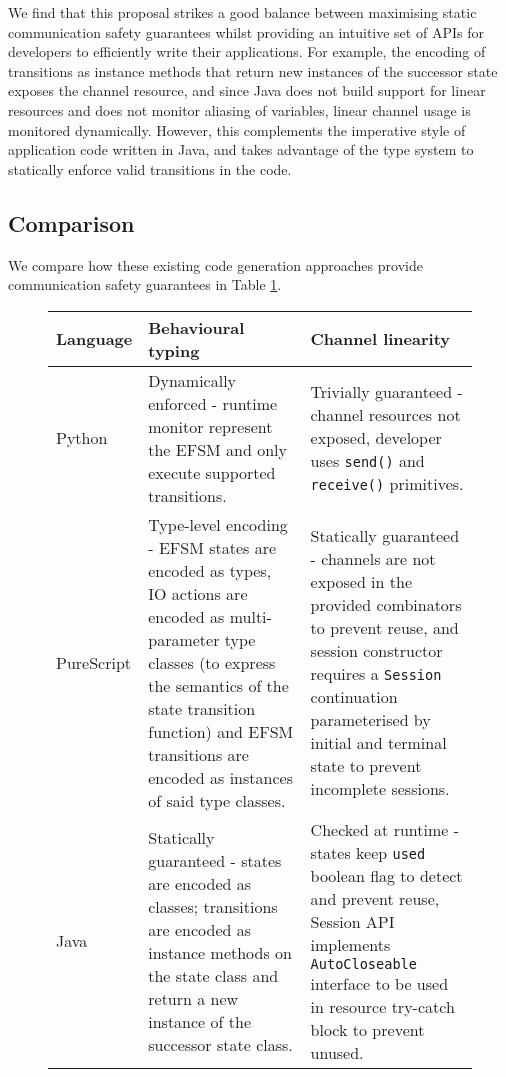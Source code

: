 We find that this proposal strikes a good balance between maximising static communication safety guarantees whilst providing an intuitive set of APIs for developers to efficiently write their applications. For example, the encoding of transitions as instance methods that return new instances of the successor state exposes the channel resource, and since Java does not build support for linear resources and does not monitor aliasing of variables, linear channel usage is monitored dynamically. However, this complements the imperative style of application code written in Java, and takes advantage of the type system to statically enforce valid transitions in the code.

\subsection{Comparison}
\label{section:codegencompare}

We compare how these existing code generation approaches provide communication safety guarantees in Table \ref{table:comparison}.


\begin{figure}[!h]
\centering
\begin{tabular}{l || p{} | p{}}
Language & Behavioural typing & Channel linearity \\
\hline\hline
Python \cite{Python2017} & Dynamically enforced - runtime monitor represent the EFSM and only execute supported transitions. & Trivially guaranteed - channel resources not exposed, developer uses \texttt{send()} and \texttt{receive()} primitives. \\
\hline
PureScript \cite{PureScript2019} & Type-level encoding - EFSM states are encoded as types, IO actions are encoded as multi-parameter type classes (to express the semantics of the state transition function) and EFSM transitions are encoded as instances of said type classes. & Statically guaranteed - channels are not exposed in the provided combinators to prevent reuse, and session constructor requires a \texttt{Session} continuation parameterised by initial and terminal state to prevent incomplete sessions.  \\
\hline
Java \cite{Hybrid2016} & Statically guaranteed - states are encoded as classes; transitions are encoded as instance methods on the state class and return a new instance of the successor state class. & Checked at runtime - states keep \texttt{used} boolean flag to detect and prevent reuse, Session API implements \texttt{AutoCloseable} interface to be used in resource try-catch block to prevent unused.
\end{tabular}
\label{table:comparison}
\end{figure}
